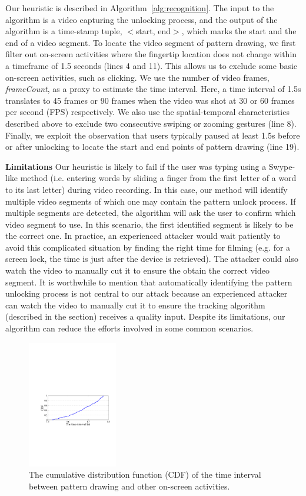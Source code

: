 Our heuristic is described
in Algorithm~\ref{alg:recognition}. The input to the algorithm is a video capturing the unlocking process, and the output of the
algorithm is a time-stamp tuple, $<$start, end$>$, which marks the start and the end
of a video segment.
To locate the video segment of pattern drawing, we first filter out on-screen activities where the
fingertip location does not change within a timeframe of 1.5 seconds (lines 4 and 11). This
allows us to exclude some basic on-screen activities, such as clicking. We
use the number of video frames, \emph{frameCount}, as a proxy to estimate the time interval. Here, a time
interval of 1.5s translates to 45 frames or 90 frames when the video was shot
at 30 or 60 frames per second (FPS) respectively. We also use the
spatial-temporal characteristics described above to exclude two consecutive swiping or zooming gestures (line 8). Finally, we exploit the observation that users
typically paused at least 1.5s before or after unlocking to locate the start
and end points of pattern drawing (line 19).

\noindent \textbf{Limitations} Our heuristic is likely to fail if the user was typing
using a Swype-like method (i.e. entering words by sliding a finger from
the first letter of a word to its last letter) during video recording. In
this case, our method will identify multiple video segments of which one may contain
the pattern unlock process. If multiple segments are detected, the algorithm will ask the
user to confirm which video segment to use.
In this scenario, the first identified segment is likely to be the correct one.
In practice, an experienced attacker would wait patiently to avoid this
complicated situation by finding the right time for filming (e.g. for a screen
lock, the time is just after the device is retrieved).
The attacker could also watch the video to manually cut it to ensure the obtain the correct video segment.
It is
worthwhile to mention that automatically identifying the pattern unlocking process is
not central to our attack because an experienced attacker can watch the video to manually cut it to ensure the tracking algorithm (described in the section) receives a quality input.
Despite its limitations, our algorithm can reduce the efforts involved in some common scenarios.

\begin{figure}[!t]
    \centering
    \includegraphics[width=0.35\textwidth]{fig/time-interval.pdf}
    \caption{The cumulative distribution function (CDF) of the time interval between pattern drawing and other on-screen activities.}
    \label{fig:time-interval}
\end{figure}

